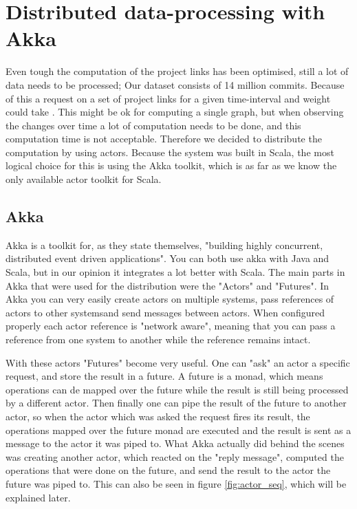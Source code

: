 \documentclass[10pt,a4paper]{article}
\begin{document}
\section{Distributed data-processing with Akka}\label{sec:distributed}
Even tough the computation of the project links has been optimised, still a lot of data needs to be processed; Our dataset consists of 14 million commits. Because of this a request on a set of project links for a given time-interval and weight could take . This might be ok for computing a single graph, but when observing the changes over time a lot of computation needs to be done, and this computation time is not acceptable. Therefore we decided to distribute the computation by using actors. Because the system was built in Scala, the most logical choice for this is using the Akka toolkit, which is as far as we know the only available actor toolkit for Scala.

\subsection{Akka}

Akka is a toolkit for, as they state themselves, "building highly concurrent, distributed event driven applications". You can both use akka with Java and Scala, but in our opinion it integrates a lot better with Scala. The main parts in Akka that were used for the distribution were the "Actors" and "Futures". In Akka you can very easily create actors on multiple systems, pass references of actors to other systemsand send messages between actors. When configured properly each actor reference is "network aware", meaning that you can pass a reference from one system to another while the reference remains intact.

With these actors "Futures" become very useful. One can "ask" an actor a specific request, and store the result in a future. A future is a monad, which means operations can de mapped over the future while the result is still being processed by a different actor.  Then finally one can pipe the result of the future to another actor, so when the actor which was asked the request fires its result, the operations mapped over the future monad are executed and the result is sent as a message to the actor it was piped to. What Akka actually did behind the scenes was creating another actor, which reacted on the "reply message", computed the operations that were done on the future, and send the result to the actor the future was piped to. This can also be seen in figure \ref{fig:actor_seq}, which will be explained later.
\end{document}
